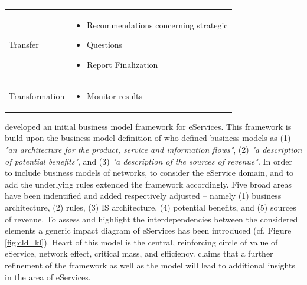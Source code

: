 \begin{table}[t]
\begin{tabular}{L{.25\textwidth}L{.65\textwidth}}
\begin{itemize}[leftmargin=*, parsep=0pt, topsep=0pt, itemsep=0pt]
			\end{itemize}	\\ \midrule
			\footnotesize Transfer &
			\vspace{-4mm}
			\footnotesize
			\begin{itemize}[leftmargin=*, parsep=0pt, topsep=0pt, itemsep=0pt]
				\item Recommendations concerning strategic
				\item Questions
				\item Report Finalization \vspace{-\baselineskip} 
			\end{itemize}	\\ \midrule
			\footnotesize Transformation &
			\vspace{-4mm}
			\footnotesize
			\begin{itemize}[leftmargin=*, parsep=0pt, topsep=0pt, itemsep=0pt]
				\item Monitor results \vspace{-\baselineskip} 
			\end{itemize}	\\ \bottomrule
	\end{tabular}
\end{table}

\citet{Klueber2000} developed an initial business model framework for eServices. This framework is build upon the business model definition of \citet[p. 4]{Timmers1998} who defined business models as (1) \textit{"an architecture for the product, service and information flows"}, (2) \textit{"a description of potential benefits"}, and (3) \textit{"a description of the sources of revenue"}. In order to include business models of networks, to consider the eService domain, and to add the underlying rules \citet{Klueber2000} extended the framework accordingly. Five broad areas have been indentified and added respectively adjusted -- namely (1) business architecture, (2) rules, (3) \ac{IS} architecture, (4) potential benefits, and (5) sources of revenue. To assess and highlight the interdependencies between the considered elements a generic impact diagram of eServices has been introduced (cf. Figure \ref{fig:cld_kl}). Heart of this model is the central, reinforcing circle of value of eService, network effect, critical mass, and efficiency. \citet{Klueber2000} claims that a further refinement of the framework as well as the model will lead to additional insights in the area of eServices. 

